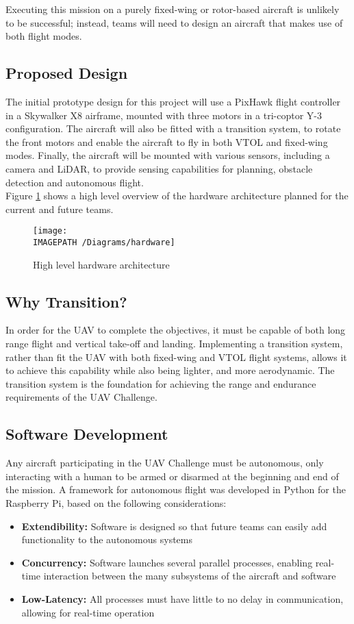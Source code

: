 Executing this mission on a purely fixed-wing or rotor-based aircraft is unlikely to be successful; instead, teams will need to design an aircraft that makes use of both flight modes.

\subsection{Proposed Design}
The initial prototype design for this project will use a PixHawk flight controller in a Skywalker X8 airframe, mounted with three motors in a tri-coptor Y-3 configuration. The aircraft will also be fitted with a transition system, to rotate the front motors and enable the aircraft to fly in both VTOL and fixed-wing modes. Finally, the aircraft will be mounted with various sensors, including a camera and LiDAR, to provide sensing capabilities for planning, obstacle detection and autonomous flight.\\

Figure \ref{fig:hardwarearch-exec} shows a high level overview of the hardware architecture planned for the current and future teams.

\begin{figure}[!h]
	\centering
	\texttt{[image: \\IMAGEPATH /Diagrams/hardware]}
	\caption{High level hardware architecture}
	\label{fig:hardwarearch-exec}
\end{figure}

\subsection{Why Transition?}
In order for the UAV to complete the objectives, it must be capable of both long range flight and vertical take-off and landing. Implementing a transition system, rather than fit the UAV with both fixed-wing and VTOL flight systems, allows it to achieve this capability while also being lighter, and more aerodynamic. The transition system is the foundation for achieving the range and endurance requirements of the UAV Challenge.

\subsection{Software Development}
Any aircraft participating in the UAV Challenge must be autonomous, only interacting with a human to be armed or disarmed at the beginning and end of the mission. A framework for autonomous flight was developed in Python for the Raspberry Pi, based on the following considerations:
\begin{itemize}
	\item \textbf{Extendibility:} Software is designed so that future teams can easily add functionality to the autonomous systems
	\item \textbf{Concurrency:} Software launches several parallel processes, enabling real-time interaction between the many subsystems of the aircraft and software
	\item \textbf{Low-Latency:} All processes must have little to no delay in communication, allowing for real-time operation 
\end{itemize}

